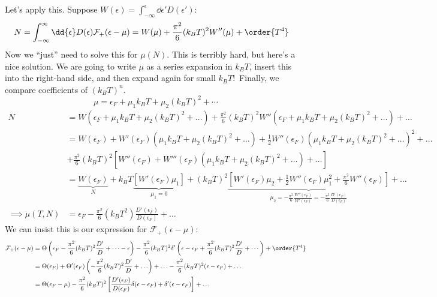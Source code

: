 \documentclass[a4paper,twoside,master.tex]{subfiles}
\begin{document}
Let's apply this. Suppose $ W(\epsilon) = \int_{- \infty}^{\epsilon} \dd{\epsilon'} D(\epsilon') $:
\begin{align}
    N &= \int_{- \infty}^{\infty} \dd{\epsilon} D(\epsilon) \mathcal{F}_+(\epsilon - \mu) = W(\mu) + \frac{\pi^2}{6} (k_B T)^2 W''(\mu) + \order{T^4}
\end{align}
Now we ``just'' need to solve this for $ \mu(N) $. This is terribly hard, but here's a nice solution. We are going to write $ \mu $ as a series expansion in $ k_B T $, insert this into the right-hand side, and then expand again for small $ k_B T $!\ Finally, we compare coefficients of $ (k_B T)^n $.
\begin{equation}
    \mu = \epsilon_F + \mu_1 k_B T + \mu_2(k_B T)^2 + \cdots
\end{equation}
\begin{align}
    N &= W(\epsilon_F + \mu_1 k_B T + \mu_2 (k_B T)^2 + \ldots) + \frac{\pi^2}{6} (k_B T)^2 W''(\epsilon_F + \mu_1 k_B T + \mu_2 (k_B T)^2 + \ldots) + \ldots \\
    &= W(\epsilon_F) + W'(\epsilon_F) \left( \mu_1 k_B T + \mu_2 (k_B T)^2 + \ldots \right) + \frac{1}{2} W''(\epsilon_F) \left( \mu_1 k_B T + \mu_2(k_B T)^2 + \ldots \right)^2 + \ldots \\
    &+ \frac{\pi^2}{6} (k_B T)^2 \left[ W''(\epsilon_F) + W'''(\epsilon_F) \left( \mu_1 k_B T + \mu_2 (k_B T)^2 + \ldots \right) + \ldots \right] \\
    &= \underbrace{W(\epsilon_F)}_{N} + k_B T \underbrace{\left[ W'(\epsilon_F) \mu_1 \right]}_{\mu_1 = 0} + (k_B T)^2 \underbrace{\left[ W'(\epsilon_F) \mu_2 + \frac{1}{2} W''(\epsilon_F) \mu_1^2 + \frac{\pi^2}{6} W''(\epsilon_F) \right]}_{\mu_2 = - \frac{\pi^2}{6} \frac{W''(\epsilon_F)}{W'(\epsilon_F)} = - \frac{\pi^2}{6} \frac{D'(\epsilon_F)}{D(\epsilon_F)}} + \ldots \\
    \implies \mu(T,N) &= \epsilon_F - \frac{\pi^2}{6} (k_B T^2) \frac{D'(\epsilon_F)}{D(\epsilon_F)} + \ldots
\end{align}
We can insist this is our expression for $ \mathcal{F}_+(\epsilon - \mu) $:
\begin{align}
    \mathcal{F}_+(\epsilon - \mu) &= \Theta\left( \epsilon_F - \frac{\pi^2}{6} (k_B T)^2 \frac{D'}{D} + \cdots - \epsilon \right) - \frac{\pi^2}{6} (k_B T)^2 \delta'\left( \epsilon - \epsilon_F + \frac{\pi^2}{6} (k_B T)^2 \frac{D'}{D} + \cdots \right) + \order{T^4} \\
    &= \Theta(\epsilon_F) + \Theta'(\epsilon_F) \left( - \frac{\pi^2}{6} (k_B T)^2 \frac{D'}{D} + \ldots \right) +\ldots - \frac{\pi^2}{6} (k_B T)^2 (\epsilon - \epsilon_F)+ \ldots \\
    &= \Theta(\epsilon_F - \mu) - \frac{\pi^2}{6} (k_B T)^2 \left[ \frac{D'(\epsilon_F)}{D(\epsilon_F)} \delta(\epsilon - \epsilon_F) + \delta'(\epsilon - \epsilon_F) \right] + \ldots
\end{align}
\end{document}
